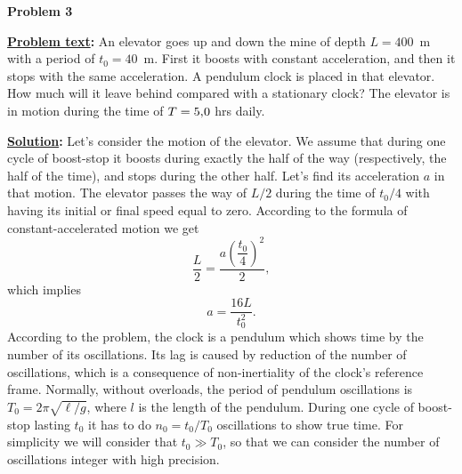 \documentclass[11pt,a4paper]{article}
\begin{document}
\begin{center}
\textbf{\LARGE{Problem 3}}
\end{center}
\vspace{5mm}

\textbf{\underline{Problem text}:} An elevator goes up and down the mine of depth $L=400$~m with a period of ${t_0=40}$~m. First it boosts with constant acceleration, and then it stops with the same acceleration. A pendulum clock is placed in that elevator. How much will it leave behind compared with a stationary clock? The elevator is in motion during the time of $T=5,\hspace{-0.5mm}0$ hrs daily.

\textbf{\underline{Solution}:} Let's consider the motion of the elevator. We assume that during one cycle of boost-stop it boosts during exactly the half of the way (respectively, the half of the time), and stops during the other half. Let's find its acceleration $a$ in that motion. The elevator passes the way of $L/2$ during the time of $t_0/4$ with having its initial or final speed equal to zero. According to the formula of constant-accelerated motion we get
$$
  \frac{L}{2}=\frac{a\left(\dfrac{t_0}{4}\right)^2}{2},
$$
which implies
$$
  a=\frac{16L}{t_0^2}.
$$
According to the problem, the clock is a pendulum which shows time by the number of its oscillations. Its lag is caused by reduction of the number of oscillations, which is a consequence of non-inertiality of the clock's reference frame. Normally, without overloads, the period of pendulum oscillations is $T_0=2\pi\sqrt{\ell/g}$, where $l$ is the length of the pendulum. During one cycle of boost-stop lasting $t_0$ it has to do $n_0=t_0/T_0$ oscillations to show true time. For simplicity we will consider that $t_0\gg T_0$, so that we can consider the number of oscillations integer with high precision.
\end{document}
